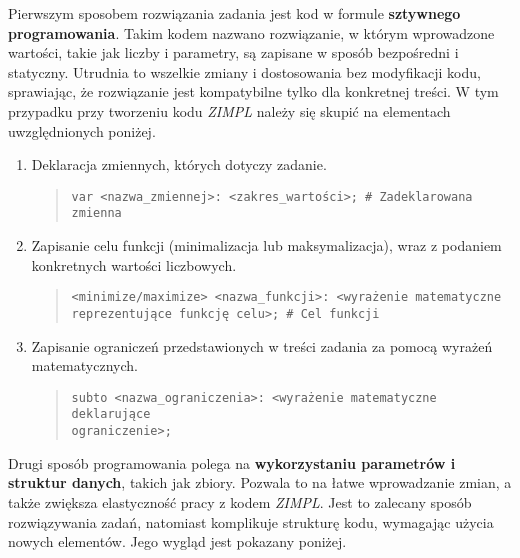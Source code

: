 Pierwszym sposobem rozwiązania zadania jest kod w formule \textbf{sztywnego programowania}. Takim kodem nazwano rozwiązanie, w którym wprowadzone wartości, takie jak liczby i parametry, są zapisane w sposób bezpośredni i statyczny. Utrudnia to wszelkie zmiany i dostosowania bez modyfikacji kodu, sprawiając, że rozwiązanie jest kompatybilne tylko dla konkretnej treści. W tym przypadku przy tworzeniu kodu  \textit{ZIMPL} należy się skupić na elementach uwzględnionych poniżej.

\begin{enumerate}
\item Deklaracja zmiennych, których dotyczy zadanie.

\begin{quote}
\begin{verbatim}
var <nazwa_zmiennej>: <zakres_wartości>; # Zadeklarowana zmienna
\end{verbatim}
\end{quote}

\item Zapisanie celu funkcji (minimalizacja lub maksymalizacja), wraz z podaniem konkretnych wartości liczbowych.

\begin{quote}
\begin{verbatim}
<minimize/maximize> <nazwa_funkcji>: <wyrażenie matematyczne
reprezentujące funkcję celu>; # Cel funkcji
\end{verbatim}
\end{quote}

\item Zapisanie ograniczeń przedstawionych w treści zadania za pomocą wyrażeń matematycznych.

\begin{quote}
\begin{verbatim}
subto <nazwa_ograniczenia>: <wyrażenie matematyczne deklarujące
ograniczenie>;
\end{verbatim}
\end{quote}
\end{enumerate}

Drugi sposób programowania polega na \textbf{wykorzystaniu parametrów i struktur danych}, takich jak zbiory. Pozwala to na łatwe wprowadzanie zmian, a także zwiększa elastyczność pracy z kodem  \textit{ZIMPL}. Jest to zalecany sposób rozwiązywania zadań, natomiast komplikuje strukturę kodu, wymagając użycia nowych elementów. Jego wygląd jest pokazany poniżej.

